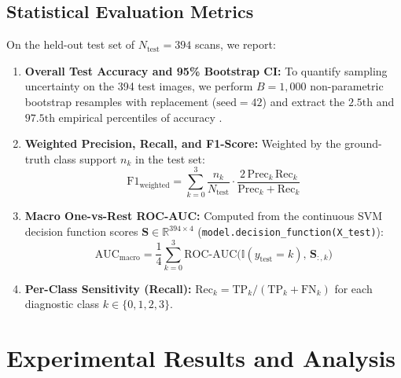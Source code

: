 \documentclass[conference]{IEEEtran}
\begin{document}
\subsection{Statistical Evaluation Metrics}
On the held-out test set of $N_{\text{test}} = 394$ scans, we report:
\begin{enumerate}
    \item \textbf{Overall Test Accuracy and 95\% Bootstrap CI:} To quantify sampling uncertainty on the 394 test images, we perform $B = 1,000$ non-parametric bootstrap resamples with replacement ($\text{seed}=42$) and extract the $2.5\text{th}$ and $97.5\text{th}$ empirical percentiles of accuracy \cite{efron1993introduction}.
    \item \textbf{Weighted Precision, Recall, and F1-Score:} Weighted by the ground-truth class support $n_k$ in the test set:
    \begin{equation}
        \text{F1}_{\text{weighted}} = \sum_{k=0}^{3} \frac{n_k}{N_{\text{test}}} \cdot \frac{2 \, \text{Prec}_k \, \text{Rec}_k}{\text{Prec}_k + \text{Rec}_k}
    \end{equation}
    \item \textbf{Macro One-vs-Rest ROC-AUC:} Computed from the continuous SVM decision function scores $\mathbf{S} \in \mathbb{R}^{394 \times 4}$ (\texttt{model.decision\_function(X\_test)}):
    \begin{equation}
        \text{AUC}_{\text{macro}} = \frac{1}{4} \sum_{k=0}^{3} \text{ROC-AUC}\big(\mathbb{I}(y_{\text{test}} = k), \, \mathbf{S}_{:, k}\big)
    \end{equation}
    \item \textbf{Per-Class Sensitivity (Recall):} $\text{Rec}_k = \text{TP}_k / (\text{TP}_k + \text{FN}_k)$ for each diagnostic class $k \in \{0, 1, 2, 3\}$.
\end{enumerate}

\section{Experimental Results and Analysis}
\end{document}
